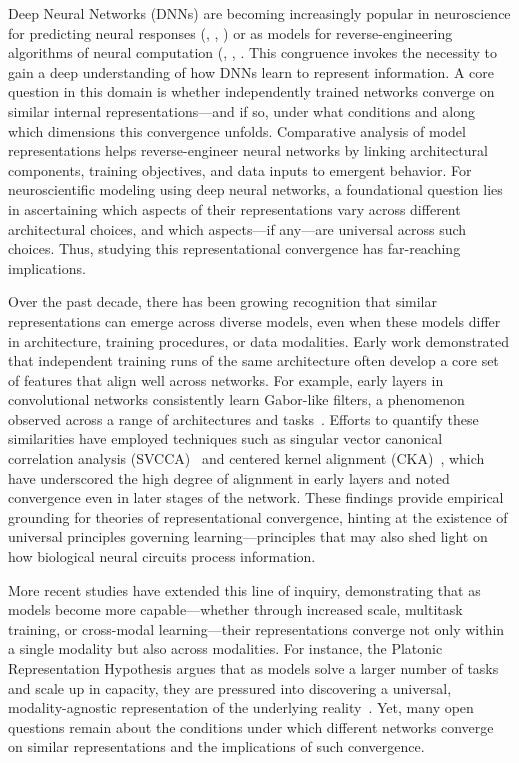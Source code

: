 Deep Neural Networks (DNNs) are becoming increasingly popular in neuroscience for predicting neural responses (\citep{yamins2014performance}, \citep{yamins2016using}, \citep{khaligh2014deep}) or as models for reverse-engineering algorithms of neural computation (\citep{schrimpf2018brain}, \citep{schrimpf2020integrative}, \citep{cichy2016comparison}. This congruence invokes the necessity to gain a deep understanding of how DNNs learn to represent information. A core question in this domain is whether independently trained networks converge on similar internal representations---and if so, under what conditions and along which dimensions this convergence unfolds. Comparative analysis of model representations helps reverse-engineer neural networks by linking architectural components, training objectives, and data inputs to emergent behavior. For neuroscientific modeling using deep neural networks, a foundational question lies in ascertaining which aspects of their representations vary across different architectural choices, and which aspects---if any---are universal across such choices. Thus, studying this representational convergence has far-reaching implications. 

Over the past decade, there has been growing recognition that similar representations can emerge across diverse models, even when these models differ in architecture, training procedures, or data modalities. Early work demonstrated that independent training runs of the same architecture often develop a core set of features that align well across networks. For example, early layers in convolutional networks consistently learn Gabor-like filters, a phenomenon observed across a range of architectures and tasks~\citep{yosinski2014transferable}. Efforts to quantify these similarities have employed techniques such as singular vector canonical correlation analysis (SVCCA)~\citep{raghu2017svcca} and centered kernel alignment (CKA)~\citep{kornblith2019similarity}, which have underscored the high degree of alignment in early layers and noted convergence even in later stages of the network. These findings provide empirical grounding for theories of representational convergence, hinting at the existence of universal principles governing learning---principles that may also shed light on how biological neural circuits process information.

More recent studies have extended this line of inquiry, demonstrating that as models become more capable---whether through increased scale, multitask training, or cross-modal learning---their representations converge not only within a single modality but also across modalities. For instance, the Platonic Representation Hypothesis argues that as models solve a larger number of tasks and scale up in capacity, they are pressured into discovering a universal, modality-agnostic representation of the underlying reality~\citep{huh2024platonic}. Yet, many open questions remain about the conditions under which different networks converge on similar representations and the implications of such convergence.

